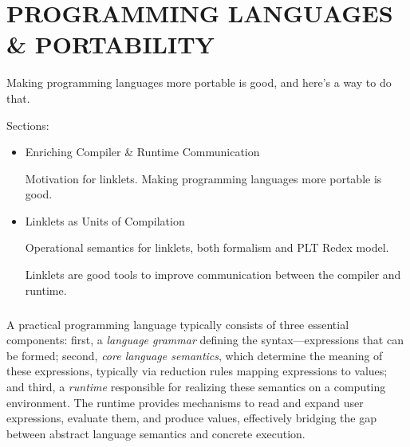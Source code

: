 \chapter[\texorpdfstring{PROGRAMMING LANGUAGES \& PORTABILITY}
                          {3. Linklets}]{PROGRAMMING LANGUAGES \& PORTABILITY}
\label{chapter:linklets}

	\begin{chaptersynopsis}

        Making programming languages more portable is good, and here's a way to do that.

        \vspace{2em}

        Sections:
		\begin{itemize}
			\item Enriching Compiler \& Runtime Communication

                Motivation for linklets. Making programming languages more portable is good.
			\item Linklets as Units of Compilation

                Operational semantics for linklets, both formalism and PLT Redex model.

				Linklets are good tools to improve communication between the compiler and runtime.
		\end{itemize}
    \end{chaptersynopsis}

	\paragraph{}%
  		A practical programming language typically consists of three essential components: first, a \emph{language grammar} defining the syntax—expressions that can be formed; second, \emph{core language semantics}, which determine the meaning of these expressions, typically via reduction rules mapping expressions to values; and third, a \emph{runtime} responsible for realizing these semantics on a computing environment. The runtime provides mechanisms to read and expand user expressions, evaluate them, and produce values, effectively bridging the gap between abstract language semantics and concrete execution.

